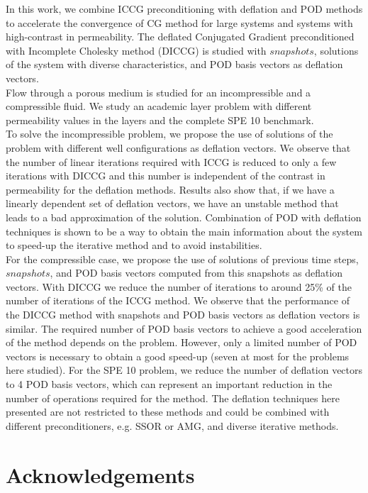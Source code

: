 \documentclass[review]{elsarticle}
\begin{document}
In this work, we combine ICCG preconditioning with deflation and POD methods to accelerate the 
convergence of CG method for large systems and systems with high-contrast in permeability. 
The deflated Conjugated Gradient preconditioned with Incomplete Cholesky method (DICCG) is studied 
with $snapshots$, solutions of the system with diverse characteristics, and POD basis vectors as 
deflation vectors. \\
Flow through a porous medium is studied for an incompressible and a compressible fluid. We study an 
academic layer problem with different permeability values in the layers and the complete SPE 10 
benchmark.\\
To solve the incompressible problem, we propose the use of solutions of the problem with different 
well configurations as deflation vectors. We observe that the number of linear iterations required with ICCG is reduced to only a few iterations with DICCG and this number is independent of the contrast in permeability for the deflation methods. Results also show that, if we have a linearly dependent set of deflation vectors, we have an unstable method that leads to a bad approximation of the solution. Combination of POD with deflation techniques is shown to be a way to obtain the main information about the system to speed-up the iterative method and to avoid instabilities.\\
For the compressible case, we propose the use of solutions of previous time steps, $snapshots$, 
and POD basis vectors computed from this snapshots as deflation vectors. 
With DICCG we reduce the number of iterations to around 25\% of 
the number of iterations of the ICCG method. We observe that the performance of the 
DICCG method with snapshots and POD basis vectors as deflation vectors is similar. The required 
number of POD basis vectors to achieve a good acceleration of the method depends on the problem. 
However, only a limited number of POD vectors is necessary to obtain a good speed-up 
(seven at most for the problems here studied). For the SPE 10 problem, we reduce the number of 
deflation vectors to 4 POD basis vectors, which can represent an important reduction in the number 
of operations required for the method. 
The deflation techniques here presented are not restricted to these methods and could be 
combined with different preconditioners, e.g. SSOR or AMG, and diverse iterative methods.

\section{Acknowledgements}
\end{document}
